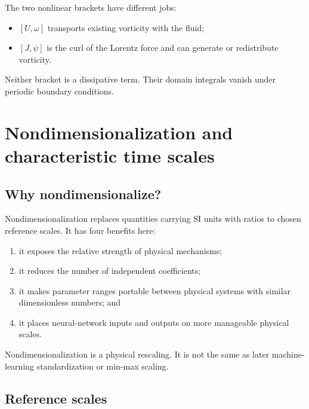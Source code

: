 \documentclass[11pt]{article}
\begin{document}
\begin{checkpointbox}
The two nonlinear brackets have different jobs:
\begin{itemize}
  \item $[U,\omega]$ transports existing vorticity with the fluid;
  \item $[J,\psi]$ is the curl of the Lorentz force and can generate or redistribute vorticity.
\end{itemize}
Neither bracket is a dissipative term. Their domain integrals vanish under periodic boundary conditions.
\end{checkpointbox}

\section{Nondimensionalization and characteristic time scales}
\label{sec:nondim}

\subsection{Why nondimensionalize?}

Nondimensionalization replaces quantities carrying SI units with ratios to chosen reference scales. It has four benefits here:
\begin{enumerate}[label=(\alph*)]
  \item it exposes the relative strength of physical mechanisms;
  \item it reduces the number of independent coefficients;
  \item it makes parameter ranges portable between physical systems with similar dimensionless numbers; and
  \item it places neural-network inputs and outputs on more manageable physical scales.
\end{enumerate}
Nondimensionalization is a physical rescaling. It is not the same as later machine-learning standardization or min-max scaling.

\subsection{Reference scales}
\end{document}
